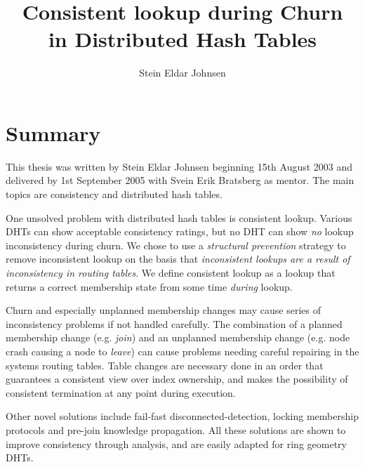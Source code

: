 \documentclass[a4paper,11pt]{article}
\title{Consistent lookup during Churn\\ in Distributed Hash Tables}
\author{Stein Eldar Johnsen}
\begin{document}
\newcommand{\qmark}[1]%
  {{\flqq{}#1\frqq{}}}
\newcommand{\qstring}[1]%
  {{\small\tt"{#1}"}}
\newcommand{\miniquote}[1]%
  {{\flushright\em\small{#1}}}
\renewcommand{\descriptionlabel}[1]%
  {\hspace{\labelsep}\sf{#1}}

\newbox\subfigbox \makeatletter
\newenvironment{subfloat}
{\def\caption##1{\gdef\subcapsave{\relax##1}}%
 \let\subcapsave\@empty \setbox\subfigbox\hbox
 \bgroup} {\egroup \subfigure[\subcapsave]{\box\subfigbox}} \makeatother


\maketitle

\section*{Summary}

This thesis was written by Stein Eldar Johnsen beginning 15th August 2003 and delivered by
 1st September 2005 with Svein Erik Bratsberg as mentor. The main topics are consistency and
 distributed hash tables.

One unsolved problem with distributed hash tables is consistent lookup. Various DHTs can
 show \qmark{acceptable} consistency ratings, but no DHT can show \emph{no} lookup inconsistency during
 churn. We chose to use a \emph{structural prevention} strategy to remove inconsistent
 lookup on the basis that \emph{inconsistent lookups are a result of inconsistency in routing
 tables}. We define consistent lookup as a lookup that returns a correct membership state
 from some time \emph{during} lookup.

Churn and especially \qmark{unplanned} membership changes may cause series of inconsistency
 problems if not handled carefully. The combination of a planned membership change
 (e.g. \emph{join}) and an unplanned membership change (e.g. node crash causing a node
 to \emph{leave}) can cause problems needing careful repairing in
 the systems routing tables. Table changes are necessary done in an order that guarantees
 a consistent view over index ownership, and makes the possibility of consistent termination
 at any point during execution.

Other novel solutions include fail-fast disconnected-detection, locking membership
 protocols and pre-join knowledge propagation. All these solutions are shown
 to improve consistency through analysis, and are easily adapted for ring geometry DHTs.
\end{document}
